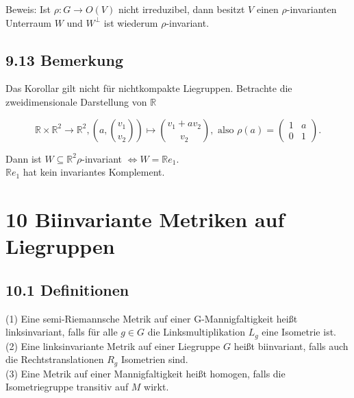 \documentclass[10pt, letterpaper]{article}
\begin{document}
Beweis: Ist $\rho: G \rightarrow O(V)$ nicht irreduzibel, dann besitzt $V$ einen $\rho$-invarianten Unterraum $W$ und $W^{\perp}$ ist wiederum $\rho$-invariant.

\subsection*{9.13 Bemerkung}
Das Korollar gilt nicht für nichtkompakte Liegruppen. Betrachte die zweidimensionale Darstellung von $\mathbb{R}$

$$
\mathbb{R} \times \mathbb{R}^{2} \rightarrow \mathbb{R}^{2},\left(a,\binom{v_{1}}{v_{2}}\right) \mapsto\binom{v_{1}+a v_{2}}{v_{2}}, \text { also } \rho(a)=\left(\begin{array}{ll}
1 & a \\
0 & 1
\end{array}\right) .
$$

Dann ist $W \subseteq \mathbb{R}^{2} \rho$-invariant $\Leftrightarrow W=\mathbb{R} e_{1}$.\\
$\mathbb{R} e_{1}$ hat kein invariantes Komplement.



\pagebreak


\section{10 Biinvariante Metriken auf Liegruppen}

\subsection*{10.1 Definitionen}
(1) Eine semi-Riemannsche Metrik auf einer G-Mannigfaltigkeit heißt linksinvariant, falls für alle $g \in G$ die Linksmultiplikation $L_{g}$ eine Isometrie ist.\\
(2) Eine linksinvariante Metrik auf einer Liegruppe $G$ heißt biinvariant, falls auch die Rechtstranslationen $R_{g}$ Isometrien sind.\\
(3) Eine Metrik auf einer Mannigfaltigkeit heißt homogen, falls die Isometriegruppe transitiv auf $M$ wirkt.
\end{document}

